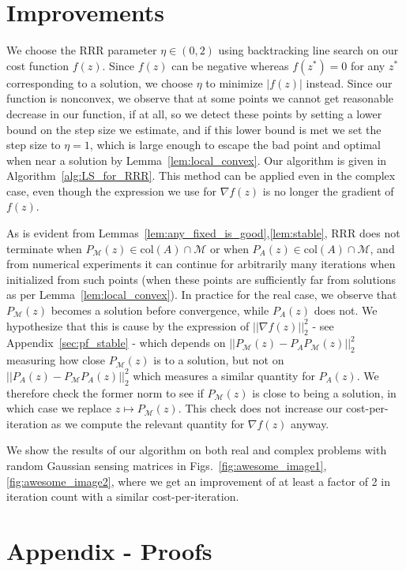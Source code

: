 \documentclass[12pt]{article}
\theoremstyle{definition}
\theoremstyle{remark}
\theoremstyle{definition}
\theoremstyle{problem}
\theoremstyle{definition}
\newcommand{\col}{\text{col}}
\newcommand{\MM}{\mathcal{M}}
\begin{document}
\section{Improvements}
We choose the RRR parameter $\eta\in(0,2)$ using backtracking line search on our cost function $f(z)$. Since $f(z)$ can be negative whereas $f(z^*)=0$ for any $z^*$ corresponding to a solution, we choose $\eta$ to minimize $|f(z)|$ instead. Since our function is nonconvex, we observe that at some points we cannot get reasonable decrease in our function, if at all, so we detect these points by setting a lower bound on the step size we estimate, and if this lower bound is met we set the step size to $\eta=1$, which is large enough to escape the bad point and optimal when near a solution by Lemma~\ref{lem:local_convex}. Our algorithm is given in Algorithm~\ref{alg:LS_for_RRR}. This method can be applied even in the complex case, even though the expression we use for $\nabla f(z)$ is no longer the gradient of $f(z)$.

As is evident from Lemmas~\ref{lem:any_fixed_is_good},\ref{lem:stable}, RRR does not terminate when $P_{\MM}(z)\in \col(A)\cap \MM$ or when $P_A(z)\in\col(A)\cap \MM$, and from numerical experiments it can continue for arbitrarily many iterations when initialized from such points (when these points are sufficiently far from solutions as per Lemma~\ref{lem:local_convex}). In practice for the real case, we observe that $P_{\MM}(z)$ becomes a solution before convergence, while $P_A(z)$ does not. We hypothesize that this is cause by the expression of $||\nabla f(z)||_2^2$ - see Appendix~\ref{sec:pf_stable} - which depends on $||P_{\MM}(z) - P_AP_{\MM}(z)||_2^2$ measuring how close $P_{\MM}(z)$ is to a solution, but not on $||P_A(z)-P_{\MM}P_A(z)||_2^2$ which measures a similar quantity for $P_A(z)$. We therefore check the former norm to see if $P_{\MM}(z)$ is close to being a solution, in which case we replace $z\mapsto P_{\MM}(z)$. This check does not increase our cost-per-iteration as we compute the relevant quantity for $\nabla f(z)$ anyway.

We show the results of our algorithm on both real and complex problems with random Gaussian sensing matrices in Figs.~\ref{fig:awesome_image1}, \ref{fig:awesome_image2}, where we get an improvement of at least a factor of 2 in iteration count with a similar cost-per-iteration.




\appendix
\section{Appendix - Proofs}
\end{document}

